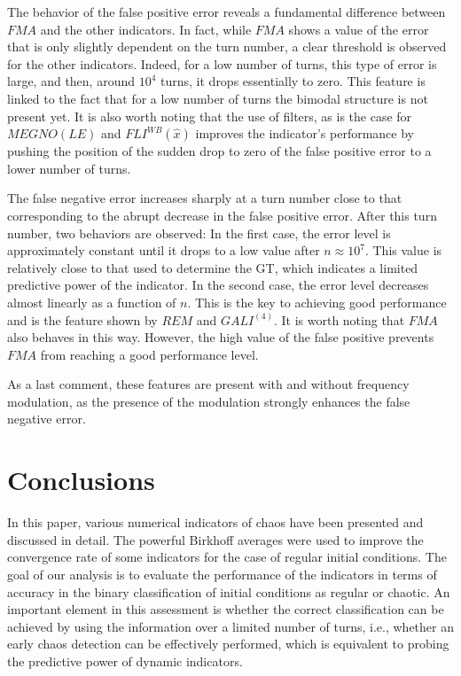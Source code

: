 The behavior of the false positive error reveals a fundamental difference between $FMA$ and the other indicators. In fact, while $FMA$ shows a value of the error that is only slightly dependent on the turn number, a clear threshold is observed for the other indicators. Indeed, for a low number of turns, this type of error is large, and then, around $10^4$ turns, it drops essentially to zero. This feature is linked to the fact that for a low number of turns the bimodal structure is not present yet. It is also worth noting that the use of filters, as is the case for $MEGNO(LE)$ and $FLI^{{WB}}(\hat{{x}})$ improves the indicator's performance by pushing the position of the sudden drop to zero of the false positive error to a lower number of turns.

The false negative error increases sharply at a turn number close to that corresponding to the abrupt decrease in the false positive error. After this turn number, two behaviors are observed: In the first case, the error level is approximately constant until it drops to a low value after $n \approx 10^7$. This value is relatively close to that used to determine the GT, which indicates a limited predictive power of the indicator. In the second case, the error level decreases almost linearly as a function of $n$. This is the key to achieving good performance and is the feature shown by $REM$ and $GALI^{(4)}$. It is worth noting that $FMA$ also behaves in this way. However, the high value of the false positive prevents $FMA$ from reaching a good performance level. 

As a last comment, these features are present with and without frequency modulation, as the presence of the modulation strongly enhances the false negative error. 
%
\section{\label{sec:conc} Conclusions}
%
In this paper, various numerical indicators of chaos have been presented and discussed in detail. The powerful Birkhoff averages were used to improve the convergence rate of some indicators for the case of regular initial conditions. The goal of our analysis is to evaluate the performance of the indicators in terms of accuracy in the binary classification of initial conditions as regular or chaotic. An important element in this assessment is whether the correct classification can be achieved by using the information over a limited number of turns, i.e., whether an early chaos detection can be effectively performed, which is equivalent to probing the predictive power of dynamic indicators. 

